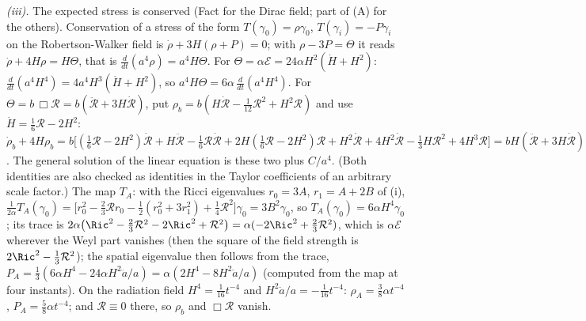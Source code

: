 \emph{(iii).} The expected stress is conserved (Fact  for the Dirac field; part of (A) for the others). Conservation of a stress of the form $T(\gamma_{0}) = \rho\gamma_{0}$, $T(\gamma_{i}) = -P\gamma_{i}$ on the Robertson-Walker field is $\dot\rho + 3H(\rho + P) = 0$; with $\rho - 3P = \Theta$ it reads $\dot\rho + 4H\rho = H\Theta$, that is $\tfrac{d}{dt}(a^{4}\rho) = a^{4}H\Theta$. For $\Theta = \alpha\mathcal{E} = 24\alpha H^{2}(\dot H + H^{2})$: $\tfrac{d}{dt}(a^{4}H^{4}) = 4a^{4}H^{3}(\dot H + H^{2})$, so $a^{4}H\Theta = 6\alpha\,\tfrac{d}{dt}(a^{4}H^{4})$. For $\Theta = b\,\Box\mathcal{R} = b(\ddot{\mathcal{R}} + 3H\dot{\mathcal{R}})$, put $\rho_{b} = b(H\dot{\mathcal{R}} - \tfrac1{12}\mathcal{R}^{2} + H^{2}\mathcal{R})$ and use $\dot H = \tfrac16\mathcal{R} - 2H^{2}$: $\dot\rho_{b} + 4H\rho_{b} = b\bigl[(\tfrac16\mathcal{R} - 2H^{2})\dot{\mathcal{R}} + H\ddot{\mathcal{R}} - \tfrac16\mathcal{R}\dot{\mathcal{R}} + 2H(\tfrac16\mathcal{R} - 2H^{2})\mathcal{R} + H^{2}\dot{\mathcal{R}} + 4H^{2}\dot{\mathcal{R}} - \tfrac13H\mathcal{R}^{2} + 4H^{3}\mathcal{R}\bigr] = bH(\ddot{\mathcal{R}} + 3H\dot{\mathcal{R}})$. The general solution of the linear equation is these two plus $C/a^{4}$. (Both identities are also checked as identities in the Taylor coefficients of an arbitrary scale factor.) The map $T_{A}$: with the Ricci eigenvalues $r_{0} = 3A$, $r_{1} = A + 2B$ of (i), $\tfrac{1}{2\alpha}T_{A}(\gamma_{0}) = \bigl[r_{0}^{2} - \tfrac23\mathcal{R}r_{0} - \tfrac12(r_{0}^{2} + 3r_{1}^{2}) + \tfrac14\mathcal{R}^{2}\bigr]\gamma_{0} = 3B^{2}\gamma_{0}$, so $T_{A}(\gamma_{0}) = 6\alpha H^{4}\gamma_{0}$; its trace is $2\alpha\bigl(\Ric^{2} - \tfrac23\mathcal{R}^{2} - 2\Ric^{2} + \mathcal{R}^{2}\bigr) = \alpha(-2\Ric^{2} + \tfrac23\mathcal{R}^{2})$, which is $\alpha\mathcal{E}$ wherever the Weyl part vanishes (then the square of the field strength is $2\Ric^{2} - \tfrac13\mathcal{R}^{2}$); the spatial eigenvalue then follows from the trace, $P_{A} = \tfrac13(6\alpha H^{4} - 24\alpha H^{2}\ddot a/a) = \alpha(2H^{4} - 8H^{2}\ddot a/a)$ (computed from the map at four instants). On the radiation field $H^{4} = \tfrac1{16}t^{-4}$ and $H^{2}\ddot a/a = -\tfrac1{16}t^{-4}$: $\rho_{A} = \tfrac38\alpha t^{-4}$, $P_{A} = \tfrac58\alpha t^{-4}$; and $\mathcal{R} \equiv 0$ there, so $\rho_{b}$ and $\Box\mathcal{R}$ vanish.

